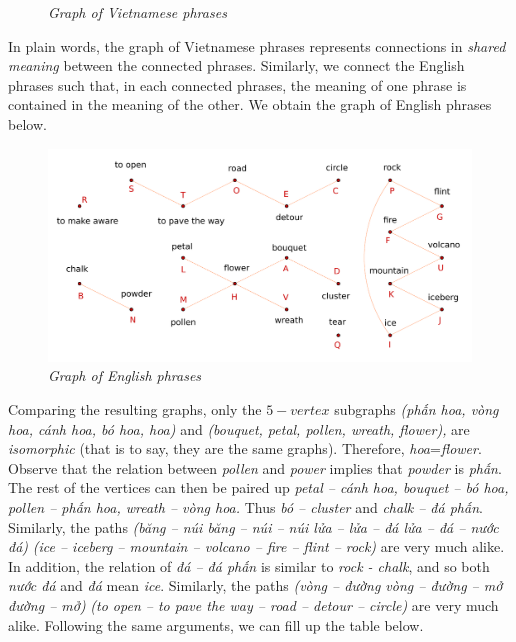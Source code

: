 \begin{multicols}{2}
\begin{figure}[H]
	\caption{\small\textit{\color{toancuabi}Graph of Vietnamese phrases}}
	\vspace*{-10pt}
\end{figure}
In plain words, the graph of Vietnamese phrases represents connections in \textit{shared meaning} between the connected phrases.
Similarly, we connect the English phrases such that, in each connected phrases, the meaning of one phrase is contained in the meaning of the other.
We obtain the graph of English phrases below.
\begin{figure}[H]
	\vspace*{-5pt}
	\centering
	\captionsetup{labelformat= empty, justification=centering}
	\includegraphics[width= 1\linewidth]{hc-2022-2-2-2-2.pdf}
	\caption{\small\textit{\color{toancuabi}Graph of English phrases}}
	\vspace*{-10pt}
\end{figure}  
Comparing the resulting graphs, only the $5-vertex$ subgraphs \textit{(phấn hoa, vòng hoa, cánh hoa, bó hoa, hoa)} and
\textit{(bouquet, petal, pollen, wreath, flower),} are \textit{isomorphic} (that is to say, they are the same graphs). Therefore, \textit{hoa}=\textit{flower}.
Observe that the relation between \textit{pollen} and \textit{power} implies that \textit{powder} is \textit{phấn}. The rest of the vertices can then be paired up
\textit{petal -- cánh hoa, bouquet -- bó hoa, pollen -- phấn hoa, wreath -- vòng hoa.}
Thus \textit{bó -- cluster} and \textit{chalk -- đá phấn}.
Similarly, the paths \textit{(băng -- núi băng -- núi -- núi lửa -- lửa -- đá lửa -- đá -- nước đá)} 
\textit{(ice -- iceberg -- mountain -- volcano -- fire -- flint -- rock)} are very much alike. In addition, the relation of \textit{đá -- đá phấn} is similar to \textit{rock - chalk}, and so both \textit{nước đá} and \textit{đá} mean \textit{ice}.
Similarly, the paths \textit{(vòng -- đường vòng -- đường -- mở đường -- mở)} 
\textit{(to open -- to pave the way -- road -- detour -- circle)} are very much alike.
\vskip 0.1cm
Following the same arguments, we can fill up the table below.
\end{multicols}
